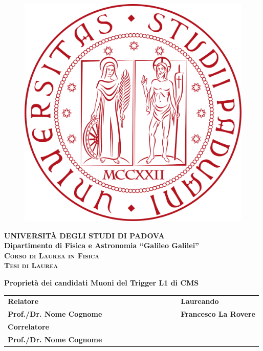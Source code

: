 \documentclass[a4paper,11pt]{book}
\begin{document}
\begin{titlepage}
\vspace{5mm}
\begin{figure}[hbtp]
\centering
\includegraphics[scale=.13]{../Immagini/unipd_logo.png}
\end{figure}
\vspace{5mm}
\begin{center}
{{\huge{\textsc{\bf UNIVERSIT\`A DEGLI STUDI DI PADOVA}}}\\}
\vspace{5mm}
{\Large{\bf Dipartimento di Fisica e Astronomia ``Galileo Galilei''}} \\
\vspace{5mm}
{\Large{\textsc{\bf Corso di Laurea in Fisica}}}\\
\vspace{20mm}
{\Large{\textsc{\bf Tesi di Laurea}}}\\
\vspace{30mm}
\begin{spacing}{3}
{\LARGE \textbf{Proprietà dei candidati Muoni del Trigger L1 di CMS}}\\
\end{spacing}
\vspace{8mm}
\end{center}

\vspace{20mm}
\begin{spacing}{2}
\begin{tabular}{ l  c  c c c  cc c c c c  l }
{\Large{\bf Relatore}} &&&&&&&&&&& {\Large{\bf Laureando}}\\
{\Large{\bf Prof./Dr. Nome Cognome}} &&&&&&&&&&& {\Large{\bf Francesco La Rovere}}\\
{\Large{\bf Correlatore}}\\
{\Large{\bf Prof./Dr. Nome Cognome}}\\
\end{tabular}
\end{spacing}
\vspace{15 mm}


\end{titlepage}
\end{document}
